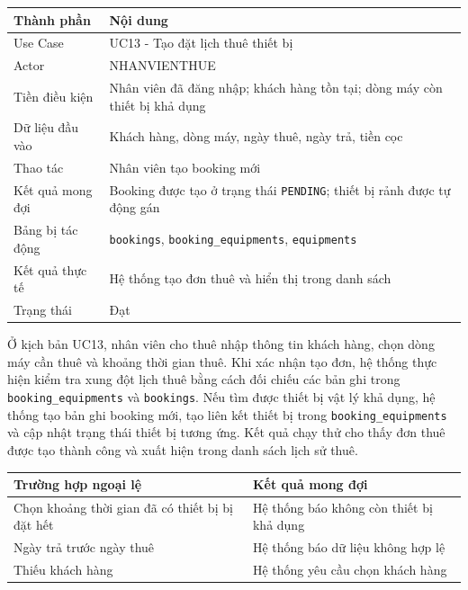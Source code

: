 \begin{table}[H]
	\centering
	\begin{tabularx}{\textwidth}{|l|X|}
		\hline
		\textbf{Thành phần} & \textbf{Nội dung} \\
		\hline
		Use Case & UC13 - Tạo đặt lịch thuê thiết bị \\
		\hline
		Actor & NHANVIENTHUE \\
		\hline
		Tiền điều kiện & Nhân viên đã đăng nhập; khách hàng tồn tại; dòng máy còn thiết bị khả dụng \\
		\hline
		Dữ liệu đầu vào & Khách hàng, dòng máy, ngày thuê, ngày trả, tiền cọc \\
		\hline
		Thao tác & Nhân viên tạo booking mới \\
		\hline
		Kết quả mong đợi & Booking được tạo ở trạng thái \texttt{PENDING}; thiết bị rảnh được tự động gán \\
		\hline
		Bảng bị tác động & \texttt{bookings}, \texttt{booking\_equipments}, \texttt{equipments} \\
		\hline
		Kết quả thực tế & Hệ thống tạo đơn thuê và hiển thị trong danh sách \\
		\hline
		Trạng thái & Đạt \\
		\hline
	\end{tabularx}
\end{table}

Ở kịch bản UC13, nhân viên cho thuê nhập thông tin khách hàng, chọn dòng máy cần thuê và khoảng thời gian thuê. Khi xác nhận tạo đơn, hệ thống thực hiện kiểm tra xung đột lịch thuê bằng cách đối chiếu các bản ghi trong \texttt{booking\_equipments} và \texttt{bookings}. Nếu tìm được thiết bị vật lý khả dụng, hệ thống tạo bản ghi booking mới, tạo liên kết thiết bị trong \texttt{booking\_equipments} và cập nhật trạng thái thiết bị tương ứng. Kết quả chạy thử cho thấy đơn thuê được tạo thành công và xuất hiện trong danh sách lịch sử thuê.

\begin{table}[H]
	\centering
	\begin{tabularx}{\textwidth}{|X|X|}
		\hline
		\textbf{Trường hợp ngoại lệ} & \textbf{Kết quả mong đợi} \\
		\hline
		Chọn khoảng thời gian đã có thiết bị bị đặt hết & Hệ thống báo không còn thiết bị khả dụng \\
		\hline
		Ngày trả trước ngày thuê & Hệ thống báo dữ liệu không hợp lệ \\
		\hline
		Thiếu khách hàng & Hệ thống yêu cầu chọn khách hàng \\
		\hline
	\end{tabularx}
\end{table}

